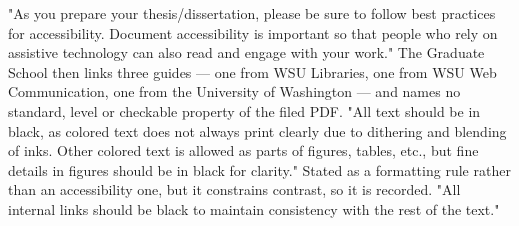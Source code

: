 	{"As you prepare your thesis/dissertation, please be sure to follow best
	 practices for accessibility. Document accessibility is important so that
	 people who rely on assistive technology can also read and engage with your
	 work." The Graduate School then links three guides — one from WSU
	 Libraries, one from WSU Web Communication, one from the University of
	 Washington — and names no standard, level or checkable property of the
	 filed PDF.}
	{"All text should be in black, as colored text does not always print clearly
	 due to dithering and blending of inks. Other colored text is allowed as
	 parts of figures, tables, etc., but fine details in figures should be in
	 black for clarity." Stated as a formatting rule rather than an
	 accessibility one, but it constrains contrast, so it is recorded.}
	{"All internal links should be black to maintain consistency with the rest of
	 the text."}

